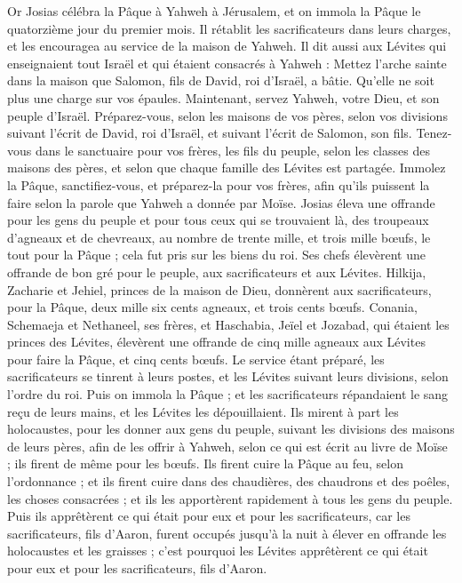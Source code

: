 \begin{multicols}{2}
\VerseOne{}Or Josias célébra la Pâque à Yahweh à Jérusalem, et on immola la Pâque le quatorzième jour du premier mois.
Il rétablit les sacrificateurs dans leurs charges, et les encouragea au service de la maison de Yahweh.
Il dit aussi aux Lévites qui enseignaient tout Israël et qui étaient consacrés à Yahweh : Mettez l'arche sainte dans la maison que Salomon, fils de David, roi d'Israël, a bâtie. Qu'elle ne soit plus une charge sur vos épaules. Maintenant, servez Yahweh, votre Dieu, et son peuple d'Israël.
Préparez-vous, selon les maisons de vos pères, selon vos divisions suivant l'écrit de David, roi d'Israël, et suivant l'écrit de Salomon, son fils.
Tenez-vous dans le sanctuaire pour vos frères, les fils du peuple, selon les classes des maisons des pères, et selon que chaque famille des Lévites est partagée.
Immolez la Pâque, sanctifiez-vous, et préparez-la pour vos frères, afin qu'ils puissent la faire selon la parole que Yahweh a donnée par Moïse.
Josias éleva une offrande pour les gens du peuple et pour tous ceux qui se trouvaient là, des troupeaux d'agneaux et de chevreaux, au nombre de trente mille, et trois mille bœufs, le tout pour la Pâque ; cela fut pris sur les biens du roi.
Ses chefs élevèrent une offrande de bon gré pour le peuple, aux sacrificateurs et aux Lévites. Hilkija, Zacharie et Jehiel, princes de la maison de Dieu, donnèrent aux sacrificateurs, pour la Pâque, deux mille six cents agneaux, et trois cents bœufs.
Conania, Schemaeja et Nethaneel, ses frères, et Haschabia, Jeïel et Jozabad, qui étaient les princes des Lévites, élevèrent une offrande de cinq mille agneaux aux Lévites pour faire la Pâque, et cinq cents bœufs.
Le service étant préparé, les sacrificateurs se tinrent à leurs postes, et les Lévites suivant leurs divisions, selon l'ordre du roi.
Puis on immola la Pâque ; et les sacrificateurs répandaient le sang reçu de leurs mains, et les Lévites les dépouillaient.
Ils mirent à part les holocaustes, pour les donner aux gens du peuple, suivant les divisions des maisons de leurs pères, afin de les offrir à Yahweh, selon ce qui est écrit au livre de Moïse ; ils firent de même pour les bœufs.
Ils firent cuire la Pâque au feu, selon l'ordonnance ; et ils firent cuire dans des chaudières, des chaudrons et des poêles, les choses consacrées ; et ils les apportèrent rapidement à tous les gens du peuple.
Puis ils apprêtèrent ce qui était pour eux et pour les sacrificateurs, car les sacrificateurs, fils d'Aaron, furent occupés jusqu'à la nuit à élever en offrande les holocaustes et les graisses ; c'est pourquoi les Lévites apprêtèrent ce qui était pour eux et pour les sacrificateurs, fils d'Aaron.

\end{multicols}
